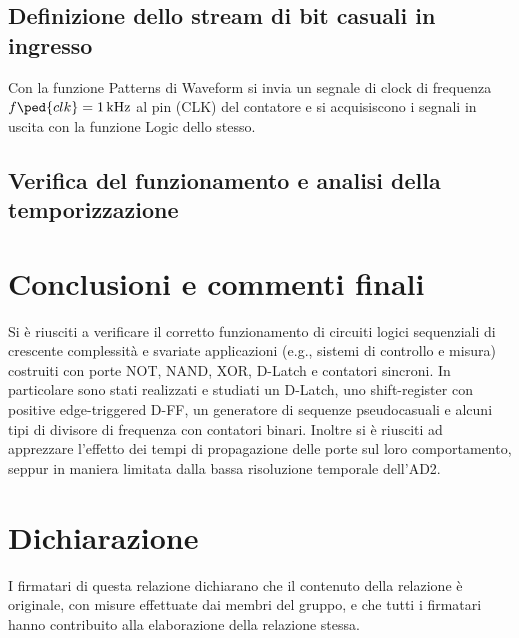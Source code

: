 \documentclass[10pt, a4paper, italian]{article}
\begin{document}
\subsection{Definizione dello stream di bit casuali in ingresso}
Con la funzione Patterns di Waveform si invia un segnale di clock di
frequenza $f\ped{clk} = \SI{1}{k\Hz}$ al pin (CLK) del contatore e si
acquisiscono i segnali in uscita con la funzione Logic
dello stesso.

\subsection{Verifica del funzionamento e analisi della temporizzazione}


\section*{Conclusioni e commenti finali}
Si è riusciti a verificare il corretto funzionamento di circuiti logici
sequenziali di crescente complessità e svariate applicazioni (e.g., sistemi di
controllo e misura) costruiti con porte NOT, NAND, XOR, D-Latch e contatori
sincroni.
In particolare sono stati realizzati e studiati un D-Latch, uno shift-register
con positive edge-triggered D-FF, un generatore di sequenze pseudocasuali e
alcuni tipi di divisore di frequenza con contatori binari.
Inoltre si è riusciti ad apprezzare l'effetto dei tempi di propagazione
delle porte sul loro comportamento, seppur in maniera limitata dalla bassa
risoluzione temporale dell'AD2.

\section*{Dichiarazione}
I firmatari di questa relazione dichiarano che il contenuto della relazione \`e
originale, con misure effettuate dai membri del gruppo, e che tutti i firmatari
hanno contribuito alla elaborazione della relazione stessa.
\end{document}
